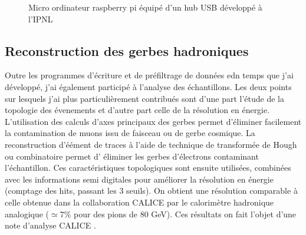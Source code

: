 \documentclass[9pt,french]{article}
\begin{document}
\begin{figure}
\centerline{}
\caption{Micro ordinateur raspberry pi \'equip\'e d'un hub USB d\'evelopp\'e \`a l'IPNL }
\label{rpi}
\end{figure}
\subsection*{Reconstruction des gerbes hadroniques}

Outre les programmes d'\'ecriture et de pr\'efiltrage de donn\'ees edn temps que j'ai d\'evelopp\'e, j'ai \'egalement particip\'e \`a l'analyse des \'echantillons. Les deux points sur lesquels j'ai plus particuli\`erement contribu\'es sont d'une part l'\'etude de la topologie des \'evenements et d'autre part celle de la r\'esolution en \'energie. L'utilisation des calculs d'axes principaux des gerbes permet d'\'eliminer facilement la contamination de muons issu de faisceau ou de gerbe cosmique. La reconstruction d'\'e\'ement de traces \`a l'aide de technique de transform\'ee de Hough ou combinatoire permet d' \'eliminer les gerbes d'\'electrons contaminant l'\'echantillon. Ces caract\'eristiques topologiques sont ensuite utilis\'ees, combin\'ees avec les informations semi digitales pour am\'eliorer la r\'esolution en \'energie (comptage des hits, passant les 3 seuils). On obtient une r\'esolution comparable \`a celle obtenue dans la collaboration CALICE par le calorim\`etre hadronique analogique ($\simeq 7 \% $  pour des pions de 80 GeV). Ces r\'esultats on fait l'objet d'une note d'analyse CALICE \cite{can37}.   
      
\end{document}
